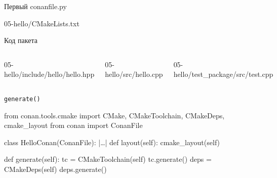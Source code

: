 \documentclass[compress, 8pt, aspectratio=169]{beamer}
\begin{document}
\begin{frame}[fragile]{Первый conanfile.py}

    {05-hello/CMakeLists.txt}

  \bigbreak

\end{frame}

\begin{frame}[fragile]{Код пакета}

  \begin{columns}[T]


      {05-hello/include/hello/hello.hpp}

    \bigbreak

      {05-hello/src/hello.cpp}


      {05-hello/test_package/src/test.cpp}

  \end{columns}

\end{frame}

\begin{frame}[fragile]{\texttt{generate()}}

  \begin{myinplacelisting}[minted language=python]
from conan.tools.cmake import CMake, CMakeToolchain, CMakeDeps, cmake_layout
from conan import ConanFile


class HelloConan(ConanFile):
  |\dots|
    def layout(self):
        cmake_layout(self)

    def generate(self):
        tc = CMakeToolchain(self)
        tc.generate()
        deps = CMakeDeps(self)
        deps.generate()
  \end{myinplacelisting}

\end{frame}
\end{document}
